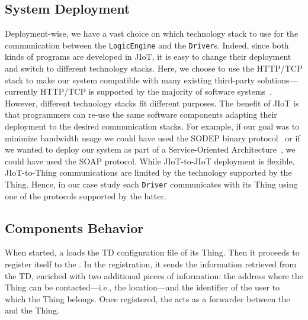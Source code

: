 \subsection{System Deployment}

Deployment-wise, we have a vast choice on which technology stack to use for
the communication between the \texttt{LogicEngine} and the \texttt{Driver}s.
Indeed, since both kinds of programs are developed in JIoT, it is easy to
change their deployment and switch to different technology stacks. Here, we
choose to use the HTTP/TCP stack to make our system compatible with many
existing third-party solutions---currently HTTP/TCP is supported by the
majority of software systems~\cite{richardson2008restful}. However, different
technology stacks fit different purposes. The benefit of JIoT is that
programmers can re-use the same software components adapting their deployment
to the desired communication stacks. For example, if our goal was to minimize
bandwidth usage we could have used the SODEP binary
protocol~\cite{MontesiGZ14} or if we wanted to deploy our system as part of a
Service-Oriented Architecture~\cite{Erl07}, we could have used the SOAP
protocol. While JIoT-to-JIoT deployment is flexible, JIoT-to-Thing
communications are limited by the technology supported by the Thing. Hence, in
our case study each \texttt{Driver} communicates with its Thing using one of
the protocols supported by the latter.


%


\subsection{Components Behavior}

When started, a  loads the TD configuration file of its Thing.
Then it proceeds to register itself to the . In the
registration, it sends the information retrieved from the TD, enriched with two
additional pieces of information: the address where the Thing can be
contacted---i.e., the  location---and the identifier of the
user to which the Thing belongs. Once registered, the  acts as
a forwarder between the  and the Thing.

